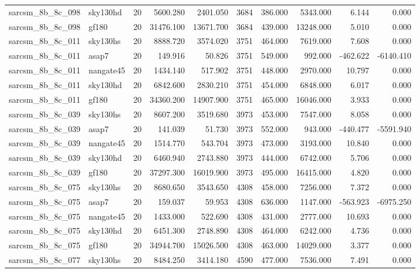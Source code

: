 \begin{longtable}{llrrrrrrrr}
sarcsm\_8b\_8c\_098 & sky130hd & 20 & 5600.280 & 2401.050 & 3684 & 386.000 & 5343.000 & 6.144 & 0.000 \\
sarcsm\_8b\_8c\_098 & gf180 & 20 & 31476.100 & 13671.700 & 3684 & 439.000 & 13248.000 & 5.010 & 0.000 \\
sarcsm\_8b\_8c\_011 & sky130hs & 20 & 8888.720 & 3574.020 & 3751 & 464.000 & 7619.000 & 7.608 & 0.000 \\
sarcsm\_8b\_8c\_011 & asap7 & 20 & 149.916 & 50.826 & 3751 & 549.000 & 992.000 & -462.622 & -6140.410 \\
sarcsm\_8b\_8c\_011 & nangate45 & 20 & 1434.140 & 517.902 & 3751 & 448.000 & 2970.000 & 10.797 & 0.000 \\
sarcsm\_8b\_8c\_011 & sky130hd & 20 & 6842.600 & 2830.210 & 3751 & 454.000 & 6848.000 & 6.017 & 0.000 \\
sarcsm\_8b\_8c\_011 & gf180 & 20 & 34360.200 & 14907.900 & 3751 & 465.000 & 16046.000 & 3.933 & 0.000 \\
sarcsm\_8b\_8c\_039 & sky130hs & 20 & 8607.200 & 3519.680 & 3973 & 453.000 & 7547.000 & 8.058 & 0.000 \\
sarcsm\_8b\_8c\_039 & asap7 & 20 & 141.039 & 51.730 & 3973 & 552.000 & 943.000 & -440.477 & -5591.940 \\
sarcsm\_8b\_8c\_039 & nangate45 & 20 & 1514.770 & 543.704 & 3973 & 473.000 & 3193.000 & 10.840 & 0.000 \\
sarcsm\_8b\_8c\_039 & sky130hd & 20 & 6460.940 & 2743.880 & 3973 & 444.000 & 6742.000 & 5.706 & 0.000 \\
sarcsm\_8b\_8c\_039 & gf180 & 20 & 37297.300 & 16019.900 & 3973 & 495.000 & 16415.000 & 4.820 & 0.000 \\
sarcsm\_8b\_8c\_075 & sky130hs & 20 & 8680.650 & 3543.650 & 4308 & 458.000 & 7256.000 & 7.372 & 0.000 \\
sarcsm\_8b\_8c\_075 & asap7 & 20 & 159.037 & 59.953 & 4308 & 636.000 & 1147.000 & -563.923 & -6975.250 \\
sarcsm\_8b\_8c\_075 & nangate45 & 20 & 1433.000 & 522.690 & 4308 & 431.000 & 2777.000 & 10.693 & 0.000 \\
sarcsm\_8b\_8c\_075 & sky130hd & 20 & 6451.300 & 2748.890 & 4308 & 464.000 & 6242.000 & 4.736 & 0.000 \\
sarcsm\_8b\_8c\_075 & gf180 & 20 & 34944.700 & 15026.500 & 4308 & 463.000 & 14029.000 & 3.377 & 0.000 \\
sarcsm\_8b\_8c\_077 & sky130hs & 20 & 8484.250 & 3414.180 & 4590 & 477.000 & 7536.000 & 7.491 & 0.000 \\

\end{longtable}
